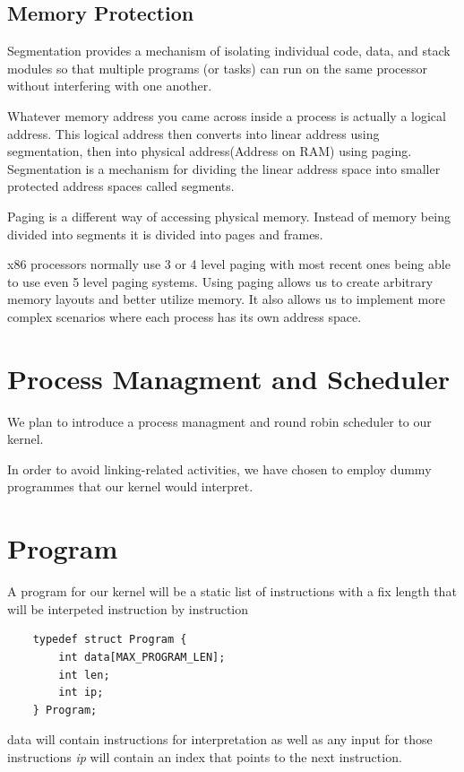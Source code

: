 \documentclass[12pt]{report}
\begin{document}
    \subsection{Memory Protection}
    Segmentation provides a mechanism of isolating individual code, data, and   
    stack modules so that multiple programs (or tasks) can run on the same processor 
    without interfering with one another.

    Whatever memory address you came across inside a process is actually a logical address. 
    This logical address then converts into linear address using segmentation, then into physical
    address(Address on RAM) using paging. Segmentation is a mechanism for
    dividing the linear address space into smaller protected address spaces called
    segments.

    Paging is a different way of accessing physical memory. Instead of memory 
    being divided into segments it is divided into pages and frames. 
    
    x86 processors normally use 3 or 4 level paging with most recent ones being able
    to use even 5 level paging systems. Using paging allows us to create arbitrary
    memory layouts and better utilize memory. It also allows us to implement
    more complex scenarios where each process has its own address space.

 
	\section{Process Managment and Scheduler}
	We plan to introduce a process managment and round robin scheduler
	to our kernel.
	
	In order to avoid linking-related activities, we have chosen to employ dummy programmes that 
	our kernel would interpret.
	
	\section{Program}
	A program for our kernel will be a static list of instructions with a fix length
	that will be interpeted instruction by instruction
	
	\begin{verbatim}
	typedef struct Program {
    	int data[MAX_PROGRAM_LEN];
    	int len;
    	int ip;
	} Program;
	\end{verbatim}
	
	data will contain instructions for interpretation as well as any input for those instructions
	\textit{ip} will contain an index that points to the next instruction.
	
\end{document}
